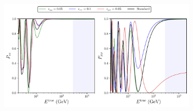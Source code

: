 \documentclass[draft=True]{revtex4-2}
\begin{document}
\begin{figure}
   \includegraphics[width=0.85\textwidth]{figures/probabilities.pdf}
   \caption{}\label{fig:nsi_probs}
\end{figure}
\end{document}
